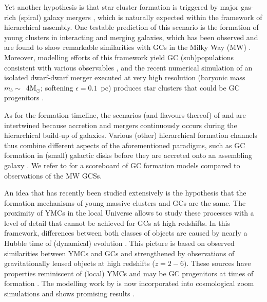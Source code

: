 \documentclass[a4paper,fleqn,usenatbib]{mnras}
\newcommand{\Sun}[0]{\ensuremath{_{\odot}}}
\begin{document}
\newpage  %
Yet another hypothesis is that star cluster formation is triggered by major 
gas-rich (spiral) galaxy mergers \citep{1987nngp.proc...18S, 1992ApJ...384...50A},
which is naturally expected within the framework of hierarchical assembly. One
testable prediction of this scenario is the formation of young clusters in
interacting and merging galaxies, which has been observed and are found to show 
remarkable similarities with GCs in the Milky Way (MW) \citep[e.g.][]{
1995AJ....109..960W, 1996AJ....112..416H, 1999AJ....118..752Z, 1999AJ....118.1551W}.
Moreover, modelling efforts of this framework yield GC (sub)populations consistent 
with various observables \citep[e.g.][]{2010ApJ...718.1266M, 2018MNRAS.480.2343C}, 
and the recent numerical simulation of an isolated dwarf-dwarf merger executed at 
very high resolution (baryonic mass $m_b \sim$~4M\Sun; softening $\epsilon = 0.1$~pc) 
produces star clusters that could be GC progenitors \citep{
2019arXiv190509840L}.

As for the formation timeline, the scenarios (and flavours thereof) of \citet{
1985ApJ...298...18F} and \citet{1992ApJ...384...50A} are intertwined because
accretion and mergers continuously occurs during the hierarchical build-up of
galaxies. Various (other) hierarchical formation channels thus combine different
aspects of the aforementioned paradigms, such as GC formation in (small) galactic
disks before they are accreted onto an assembling galaxy \citep[e.g.][]{
2000ApJ...533..869C, 2002ApJ...567..853C, 2002MNRAS.333..383B, 2003egcs.conf..224G}. 
We refer to \citet{2001astro.ph..8034G} for a scoreboard of GC formation models 
compared to observations of the MW GCSs.

An idea that has recently been studied extensively is the hypothesis that the formation
mechanisms of young massive clusters \citep[YMCs, see][for a review]{2010ARA&A..48..431P} 
and GCs are the same. The proximity of YMCs in the local Universe allows to study these 
processes with a level of detail that cannot be achieved for GCs at high redshifts. In 
this framework, differences between both classes of objects are caused by nearly a 
Hubble time of (dynamical) evolution \citep[e.g.][]{1987degc.book.....S}. This picture 
is based on observed similarities between YMCs and GCs
\citep[e.g.][]{1992AJ....103..691H,1999AJ....118.1551W} and strengthened by observations
of gravitationally lensed objects at high redshifts ($z = 2-6)$. These sources have 
properties reminiscent of (local) YMCs and may be GC progenitors at times of formation 
\citep{2017MNRAS.467.4304V,2017ApJ...843L..21J}. The modelling work by 
\citet{2011MNRAS.414.1339K,2012MNRAS.421.1927K,2015MNRAS.454.1658K} is now 
incorporated into cosmological zoom simulations and shows promising results
\citep{2018MNRAS.475.4309P,2019MNRAS.486.3134K}.
\end{document}
